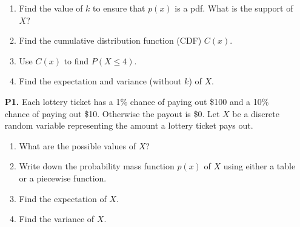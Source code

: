 \documentclass[11pt]{article}
\begin{document}
\begin{enumerate}
\begin{enumerate}
        \item Find the value of $k$ to ensure that $p(x)$ is a pdf. What is the support of \( X \)?
            \vspace{3cm}

        \item Find the cumulative distribution function (CDF) $C(x)$.
            \vspace{3cm}

        \item Use $C(x)$ to find $P(X \leq 4)$.
            \vspace{3cm}

        \item Find the expectation and variance (without \( k \)) of \( X \).

    \end{enumerate}
\newpage


\item[\textbf{P1.}]
Each lottery ticket has a 1\% chance of paying out \$100 and a 10\% chance of paying out \$10. Otherwise the payout is \$0.
Let $X$ be a discrete random variable representing the amount a lottery ticket pays out.

\begin{enumerate}
    \item What are the possible values of $X$?

    \vfill

    \item Write down the probability mass function $p(x)$ of $X$ using either a table or a piecewise function.

    \vfill
    \vfill

    \item Find the expectation of $X$.

    \vfill
    \vfill

    \item Find the variance of $X$.

    \vfill
    \vfill

\end{enumerate}


\newpage


\end{enumerate}
\end{document}
